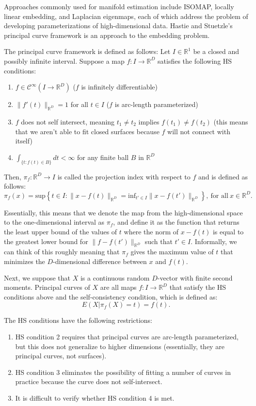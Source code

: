Approaches commonly used for manifold estimation include ISOMAP, locally linear embedding, and Laplacian eigenmaps, each of which address the problem of developing parameterizations of high-dimensional data. Hastie and Stuetzle's principal curve framework is an approach to the embedding problem.

The principal curve framework is defined as follows: Let $I \in \mathbb{R}^{1}$ be a closed and possibly infinite interval. Suppose a map $f: I \to \mathbb{R}^{D}$ satisfies the following HS conditions:
\begin{enumerate}
  \label{enum:hs_conditions}

  \item $f \in \mathcal{C}^{\infty}(I \to \mathbb{R}^{D})$ ($f$ is infinitely differentiable)
  \item $\|f'(t)\|_{\mathbb{R}^{D}} = 1$ for all $t \in I$ ($f$ is arc-length parameterized)
  \item $f$ does not self intersect, meaning $t_1 \neq t_2$ implies $f(t_1) \neq f(t_2)$ (this means that we aren't able to fit closed surfaces because $f$ will not connect with itself)
  \item $\int_{\{t: f(t) \in B\}}dt < \infty$ for any finite ball $B$ in $\mathbb{R}^{D}$
\end{enumerate}

Then, $\pi_f: \mathbb{R}^{D} \to I$ is called the projection index with respect to $f$ and is defined as follows:
\[%
  \pi_f(x) = \text{sup}\left\{t \in I: \|x - f(t)\|_{\mathbb{R}^{D}} = \text{inf}_{t' \in I}\|x - f(t')\|_{\mathbb{R}^{D}}\right\}, \ \text{for all} \ x \in \mathbb{R}^{D}
.\]%

Essentially, this means that we denote the map from the high-dimensional space to the one-dimensional interval as $\pi_f$, and define it as the function that returns the least upper bound of the values of $t$ where the norm of $x - f(t)$ is equal to the greatest lower bound for $\|f - f(t')\|_{\mathbb{R}^{D}}$ such that $t' \in I$. Informally, we can think of this roughly meaning that $\pi_f$ gives the maximum value of $t$ that minimizes the $D$-dimensional difference between $x$ and $f(t)$.

Next, we suppose that $X$ is a continuous random $D$-vector with finite second moments. Principal curves of $X$ are all maps $f: I \to \mathbb{R}^{D}$ that satisfy the HS conditions above and the self-consistency condition, which is defined as:
\[%
  E(X | \pi_f(X) = t) = f(t)
.\]%

The HS conditions have the following restrictions:
\begin{enumerate}
  \label{enum:hs_restrictions}

  \item HS condition 2 requires that principal curves are arc-length parameterized, but this does not generalize to higher dimensions (essentially, they are principal curves, not surfaces).
  \item HS condition 3 eliminates the possibility of fitting a number of curves in practice because the curve does not self-intersect.
  \item It is difficult to verify whether HS condition 4 is met.
\end{enumerate}

